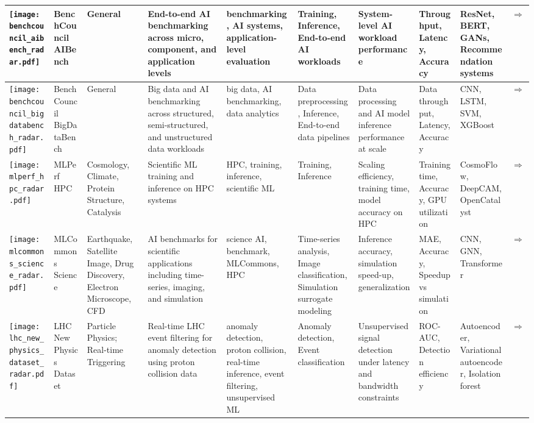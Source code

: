 \begin{landscape}
{\begin{longtable}{|p{}|p{}|p{}|p{}|p{}|p{}|p{}|p{}|p{}|p{}|}
\texttt{[image: benchcouncil\_aibench\_radar.pdf]} & BenchCouncil AIBench & General & End-to-end AI benchmarking across micro, component, and application levels & benchmarking, AI systems, application-level evaluation & Training, Inference, End-to-end AI workloads & System-level AI workload performance & Throughput, Latency, Accuracy & ResNet, BERT, GANs, Recommendation systems & \cite{gao2019aibenchindustrystandardinternet}\href{https://www.benchcouncil.org/AIBench/}{$\Rightarrow$} \\ \hline
\texttt{[image: benchcouncil\_bigdatabench\_radar.pdf]} & BenchCouncil BigDataBench & General & Big data and AI benchmarking across structured, semi-structured, and unstructured data workloads & big data, AI benchmarking, data analytics & Data preprocessing, Inference, End-to-end data pipelines & Data processing and AI model inference performance at scale & Data throughput, Latency, Accuracy & CNN, LSTM, SVM, XGBoost & \cite{gao2018bigdatabenchscalableunifiedbig}\href{https://www.benchcouncil.org/BigDataBench/}{$\Rightarrow$} \\ \hline
\texttt{[image: mlperf\_hpc\_radar.pdf]} & MLPerf HPC & Cosmology, Climate, Protein Structure, Catalysis & Scientific ML training and inference on HPC systems & HPC, training, inference, scientific ML & Training, Inference & Scaling efficiency, training time, model accuracy on HPC & Training time, Accuracy, GPU utilization & CosmoFlow, DeepCAM, OpenCatalyst & \cite{farrell2021mlperfhpcholisticbenchmark}\href{https://github.com/mlcommons/hpc}{$\Rightarrow$} \\ \hline
\texttt{[image: mlcommons\_science\_radar.pdf]} & MLCommons Science & Earthquake, Satellite Image, Drug Discovery, Electron Microscope, CFD & AI benchmarks for scientific applications including time-series, imaging, and simulation & science AI, benchmark, MLCommons, HPC & Time-series analysis, Image classification, Simulation surrogate modeling & Inference accuracy, simulation speed-up, generalization & MAE, Accuracy, Speedup vs simulation & CNN, GNN, Transformer & \cite{10.1007/978-3-031-23220-6_4}\href{https://github.com/mlcommons/science}{$\Rightarrow$} \\ \hline
\texttt{[image: lhc\_new\_physics\_dataset\_radar.pdf]} & LHC New Physics Dataset & Particle Physics; Real-time Triggering & Real-time LHC event filtering for anomaly detection using proton collision data & anomaly detection, proton collision, real-time inference, event filtering, unsupervised ML & Anomaly detection, Event classification & Unsupervised signal detection under latency and bandwidth constraints & ROC-AUC, Detection efficiency & Autoencoder, Variational autoencoder, Isolation forest & \cite{https://doi.org/10.5281/zenodo.5046389}\href{https://arxiv.org/pdf/2107.02157}{$\Rightarrow$} \\ \hline

\end{longtable}}
\end{landscape}
